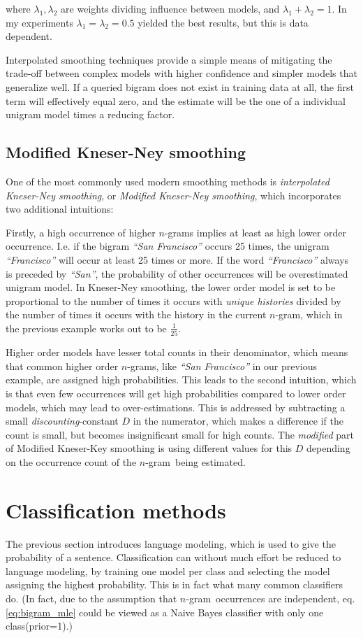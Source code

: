 \documentclass[a4paper,11pt]{kth-mag}
\newcommand{\ngram}{$n$-gram}
\begin{document}
where $\lambda_1, \lambda_2$ are weights dividing influence between models, and $\lambda_1 + \lambda_2 = 1$.
In my experiments $\lambda_1 = \lambda_2 = 0.5$ yielded the best results, but this is data dependent.

Interpolated smoothing techniques provide a simple means of mitigating
the trade-off between complex models with higher confidence
and simpler models that generalize well.
If a queried bigram does not exist in training data at all,
the first term will effectively equal zero,
and the estimate will be the one of a individual unigram model times a reducing factor.

\subsection{Modified Kneser-Ney smoothing}
One of the most commonly used modern smoothing methods is \emph{interpolated Kneser-Ney smoothing},
or \emph{Modified Kneser-Ney smoothing}\cite{nlp_book}, which incorporates two additional intuitions:

Firstly, a high occurrence of higher \ngram s implies at least as high
lower order occurrence. I.e. if the bigram \emph{``San Francisco''} occurs 25 times,
the unigram \emph{``Francisco''} will occur at least 25 times or more.
If the word \emph{``Francisco''} always is preceded by  \emph{``San''},
the probability of other occurrences will be overestimated unigram model.
In Kneser-Ney smoothing, the lower order model is set to be proportional to the
number of times it occurs with \emph{unique histories} divided by the number of times it
occurs with the history in the current \ngram\cite{chen_goodman}, which  in the previous example
works out to be $\frac{1}{25}$.

Higher order models have lesser total counts in their denominator, which means that common
higher order \ngram s, like \emph{``San Francisco''} in our previous example, are assigned high probabilities.
This leads to the second intuition, which is that even few occurrences will
get high probabilities compared to lower order models, which may lead to over-estimations.
This is addressed by subtracting a small \emph{discounting}-constant $D$ in the numerator,
which makes a difference if the count is small, but becomes insignificant small for high counts.
The \emph{modified} part of Modified Kneser-Key smoothing is using different values for this
$D$ depending on the occurrence count of the \ngram~being estimated\cite{chen_goodman}.


\section{Classification methods}
The previous section introduces language modeling, which is used to give the probability of a sentence.
Classification can without much effort be reduced to language modeling, by training one model per class and
selecting the model assigning the highest probability. This is in fact what many common classifiers do.
(In fact, due to the assumption that \ngram~occurrences are independent, eq. \ref {eq:bigram_mle}
could be viewed as a Naive Bayes classifier with only one class(prior=1).)
\end{document}
